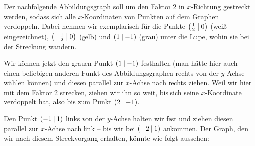 \documentclass[../../main.tex]{subfiles}
\begin{document}
\begin{example}
   Der nachfolgende Abbildungsgraph soll um den Faktor $2$ in $x$-Richtung gestreckt werden, sodass sich alle $x$-Koordinaten von Punkten auf dem Graphen verdoppeln. Dabei nehmen wir exemplarisch für die Punkte $\left(\frac{1}{2} \:\middle|\: 0\right)$ (weiß eingezeichnet), $\left(-\frac{1}{2} \:\middle|\: 0\right)$ (gelb) und $\left(1 \:\middle|\: -1\right)$ (grau) unter die Lupe, wohin sie bei der Streckung wandern.
   \begin{center}
    \end{center}
    
    Wir können jetzt den grauen Punkt $\left(1 \:\middle|\: -1\right)$ festhalten (man hätte hier auch einen beliebigen anderen Punkt des Abbildungsgraphen rechts von der $y$-Achse wählen können) und diesen parallel zur $x$-Achse nach rechts ziehen. Weil wir hier mit dem Faktor 2 strecken, ziehen wir ihn so weit, bis sich seine $x$-Koordinate verdoppelt hat, also bis zum Punkt $\left(2 \:\middle|\: -1\right)$.
    
    Den Punkt $\left(-1 \:\middle|\: 1\right)$ links von der $y$-Achse halten wir fest und ziehen diesen parallel zur $x$-Achse nach link -- bis wir bei $\left(-2 \:\middle|\: 1\right)$ ankommen. Der Graph, den wir nach diesem Streckvorgang erhalten, könnte wie folgt aussehen:
    
    \begin{center}
    \end{center}
    

\end{example}
\end{document}
